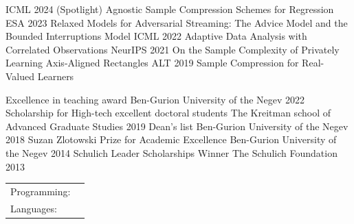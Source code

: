 \documentclass[]{awesome-cv}
\begin{document}
\begin{cventries}
	\cventry
	{ICML 2024 (Spotlight)}
	{Agnostic Sample Compression Schemes for Regression}
	{}
	{}
	{}
	\cventry
	{ESA 2023}
	{Relaxed Models for Adversarial Streaming: The Advice Model and the Bounded Interruptions Model}
	{}
	{}
	{}
	\cventry
	{ICML 2022}
	{Adaptive Data Analysis with Correlated Observations}
	{}
	{}
	{}
	\cventry
	{NeurIPS 2021}
	{On the Sample Complexity of Privately Learning Axis-Aligned Rectangles}
	{}
	{}
	{}
	\cventry
	{ALT 2019}
	{Sample Compression for Real-Valued Learners}
	{}
	{}
	{}
\end{cventries}
\vspace{-6mm}	
\begin{cvhonors}
	\cvhonor
	{Excellence in teaching award}
	{\scriptsize{Ben-Gurion University of the Negev}}
	{}
	{2022}
	\cvhonor
	{Scholarship for High-tech excellent doctoral students}
	{\scriptsize{The Kreitman school of Advanced Graduate Studies}}
	{}
	{2019}
	\cvhonor
	{Dean’s list}
	{\scriptsize{Ben-Gurion University of the Negev}}
	{}
	{2018}	
	\cvhonor
	{Suzan Zlotowski Prize for Academic Excellence}
	{\scriptsize{Ben-Gurion University of the Negev}}
	{}
	{2014}	
	\cvhonor
	{Schulich Leader Scholarships Winner}
	{\scriptsize{The Schulich Foundation}}
	{}
	{2013}	
\end{cvhonors}
\vspace{-5mm}
\begin{cventries}
	\cventry
	{\tiny}
	{\def\arraystretch{1.15}{\begin{tabular}{ l l }
		Programming:  & {\skill{\quad Python (Pandas, NumPy, Scikit-learn, XGBoost, Gensim, PyArrow); SQL (MySQL, PostgreSQL, AWS Athena); AWS (S3, Lambda, SQS, ECS); Docker; protobuf}} \\
		Languages:  & {\skill{ \quad Hebrew, English, Portuguese}} \\
		\end{tabular}}}
	{\tiny}
	{\tiny}
	{\tiny}
\end{cventries}
\end{document}
